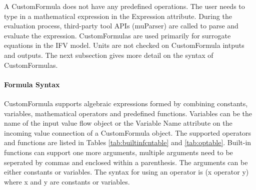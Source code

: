 A CustomFormula does not have any predefined operations. The user needs to type in a mathematical expression in the Expression attribute. During the evaluation process, third-party tool APIs (muParser) are called to parse and evaluate the expression. CustomFormulas are used primarily for surrogate equations in the IFV model. Units are not checked on CustomFormula intputs and outputs. The next subsection gives more detail on the syntax of CustomFormulas.

\paragraph{Formula Syntax}
CustomFormula supports algebraic expressions formed by combining constants, variables, mathematical operators and predefined functions. Variables can be the name of the input value flow object or the Variable Name attribute on the incoming value connection of a CustomFormula object. The supported operators and functions are listed in Tables \ref{tab:builtinfcntable} and \ref{tab:optable}. Built-in functions can support one more arguments, multiple arguments need to be seperated by commas and enclosed within a parenthesis. The arguments can be either constants or variables. The syntax for using an operator is (x operator y) where x and y are constants or variables.

